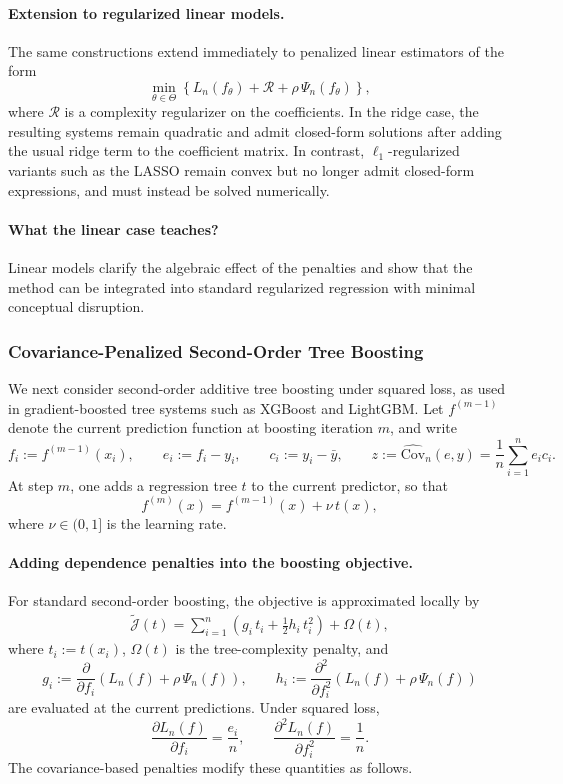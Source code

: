 \documentclass[12pt, draft]{article}
\theoremstyle{plain}
\theoremstyle{definition}
\newcommand{\1}{\mathbf{1}}
\newcommand{\Cov}{\text{Cov}}
\begin{document}
{\paragraph{Extension to regularized linear models.}
The same constructions extend immediately to penalized linear estimators of the form
\[
\min_{\theta\in\Theta}
\left\{
    L_n(f_\theta) + \mathcal{R} + \rho\,\Psi_n(f_\theta)
\right\},
\]
where \(\mathcal{R}\) is a complexity regularizer on the coefficients. In the ridge case, the resulting systems remain quadratic and admit closed-form solutions after adding the usual ridge term to the coefficient matrix. In contrast, \(\ell_1\)-regularized variants such as the LASSO remain convex but no longer admit closed-form expressions, and must instead be solved numerically.

\paragraph{What the linear case teaches?}

Linear models clarify the algebraic effect of the penalties and show that the method can be integrated into standard regularized regression with minimal conceptual disruption.

\subsubsection{Covariance-Penalized Second-Order Tree Boosting}
\label{subsec:tree_boosting}

We next consider second-order additive tree boosting under squared loss, as used in gradient-boosted tree systems such as XGBoost and LightGBM. Let \(f^{(m-1)}\) denote the current prediction function at boosting iteration \(m\), and write
\[
f_i := f^{(m-1)}(x_i),
\qquad
e_i := f_i - y_i,
\qquad
c_i := y_i - \bar y,
\qquad
z := \widehat{\Cov}_n(e,y) = \frac{1}{n}\sum_{i=1}^n e_i c_i.
\]
At step \(m\), one adds a regression tree \(t\) to the current predictor, so that
\[
f^{(m)}(x) = f^{(m-1)}(x) + \nu\,t(x),
\]
where \(\nu\in(0,1]\) is the learning rate.

\paragraph{Adding dependence penalties into the boosting objective.} For standard second-order boosting, the objective is approximated locally by
\begin{align}
    \label{eq:boosting_local_objective}
    \widetilde{\mathcal J}(t)
    =
    \sum_{i=1}^n
    \left(
        g_i\,t_i + \frac{1}{2}h_i\,t_i^2
    \right)
    +
    \Omega(t),
\end{align}
where \(t_i := t(x_i)\), \(\Omega(t)\) is the tree-complexity penalty, and
\[
g_i := \frac{\partial}{\partial f_i}
\left(
L_n(f) + \rho\,\Psi_n(f)
\right),
\qquad
h_i := \frac{\partial^2}{\partial f_i^2}
\left(
L_n(f) + \rho\,\Psi_n(f)
\right)
\]
are evaluated at the current predictions. Under squared loss,
\[
\frac{\partial L_n(f)}{\partial f_i} = \frac{e_i}{n},
\qquad
\frac{\partial^2 L_n(f)}{\partial f_i^2} = \frac{1}{n}.
\]
The covariance-based penalties modify these quantities as follows.

}
\end{document}
